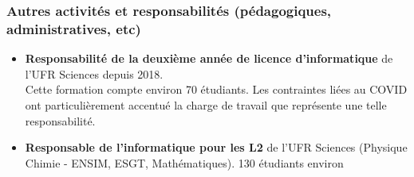 \documentclass[11pt,a4paper]{article}
\begin{document}


\subsubsection{Autres activités et responsabilités (pédagogiques, administratives, etc)}

\begin{itemize}

\item \textbf{Responsabilité de la deuxième année de licence d'informatique} de l'UFR Sciences depuis 2018.  \\
Cette formation compte environ 70 étudiants. Les contraintes liées au COVID ont particulièrement accentué la charge de travail que représente une telle responsabilité.
\item \textbf{Responsable de l'informatique pour les L2} de l'UFR Sciences (Physique Chimie - ENSIM, ESGT, Mathématiques). 130 étudiants environ
\end{itemize}






\clearpage
\end{document}
